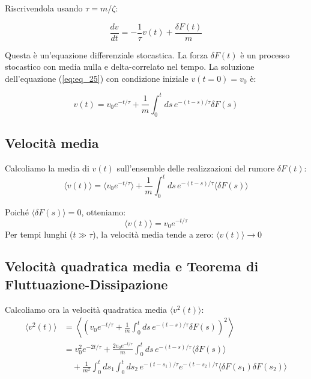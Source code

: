 Riscrivendola usando $\tau = m/\zeta$:
\begin{tcolorbox}[colback=colorA!5,colframe=colorA, arc=3mm, boxrule=1.2pt]
\begin{equation}
\label{eq:eq_25}
\frac{dv}{dt} = -\frac{1}{\tau} v(t) + \frac{\delta F(t)}{m}
\end{equation}
\end{tcolorbox}

Questa è un'equazione differenziale stocastica. La forza $\delta F(t)$ è un processo stocastico con media nulla e delta-correlato nel tempo.
La soluzione dell'equazione (\ref{eq:eq_25}) con condizione iniziale $v(t=0)=v_0$ è:
\begin{tcolorbox}[colback=colorA!5,colframe=colorA, arc=3mm, boxrule=1.2pt]
\begin{equation}
v(t) = v_0 e^{-t/\tau} + \frac{1}{m} \int_{0}^{t} ds \, e^{-(t-s)/\tau} \delta F(s)
\end{equation}
\end{tcolorbox}

\subsection{Velocità media}
Calcoliamo la media di $v(t)$ sull'ensemble delle realizzazioni del rumore $\delta F(t)$:
\begin{equation}
\langle v(t) \rangle = \langle v_0 e^{-t/\tau} \rangle + \frac{1}{m} \int_{0}^{t} ds \, e^{-(t-s)/\tau} \langle \delta F(s) \rangle
\end{equation}

Poiché $\langle \delta F(s) \rangle = 0$, otteniamo:
\begin{equation}
\langle v(t) \rangle = v_0 e^{-t/\tau}
\end{equation}
Per tempi lunghi ($t \gg \tau$), la velocità media tende a zero: $\langle v(t) \rangle \to 0$

\subsection{Velocità quadratica media e Teorema di Fluttuazione-Dissipazione}
Calcoliamo ora la velocità quadratica media $\langle v^2(t) \rangle$:
\begin{equation}
\begin{aligned}
\langle v^2(t) \rangle &= \left\langle \left( v_0 e^{-t/\tau} + \frac{1}{m} \int_{0}^{t} ds \, e^{-(t-s)/\tau} \delta F(s) \right)^2 \right\rangle \\
&= v_0^2 e^{-2t/\tau} + \frac{2v_0 e^{-t/\tau}}{m} \int_{0}^{t} ds \, e^{-(t-s)/\tau} \langle \delta F(s) \rangle \nonumber \\
&\quad + \frac{1}{m^2} \int_{0}^{t} ds_1 \int_{0}^{t} ds_2 \, e^{-(t-s_1)/\tau} e^{-(t-s_2)/\tau} \langle \delta F(s_1) \delta F(s_2) \rangle
\end{aligned}
\end{equation}

